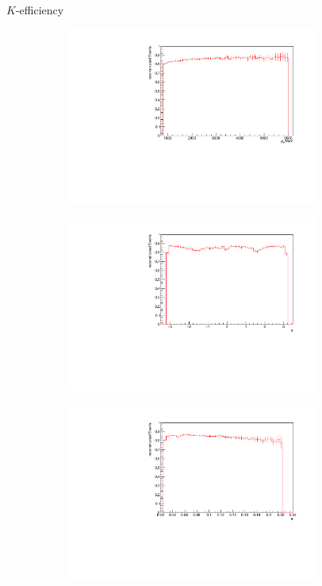 \documentclass[11pt]{beamer}
\begin{document}
\begin{frame}{$K$-efficiency}
\begin{figure}
\begin{subfigure}{0.45\textwidth}
\includegraphics[width=0.9\textwidth]{up_pdf/single/pos/h_pt_reco_K_pos.pdf}
\end{subfigure}
\begin{subfigure}{0.45\textwidth}
\includegraphics[width=0.9\textwidth]{up_pdf/single/pos/h_phi_reco_K_pos.pdf}
\end{subfigure}
\begin{subfigure}{0.45\textwidth}
\includegraphics[width=0.9\textwidth]{up_pdf/single/pos/h_theta_reco_K_pos.pdf}

\end{subfigure}
\end{figure}
\end{frame}
\end{document}
